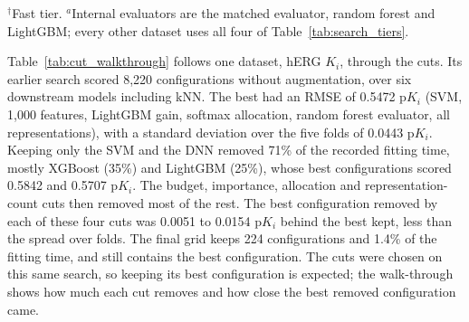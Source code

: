 \begin{table}[htbp]
\smallskip
{\footnotesize $^{\dagger}$Fast tier. $^{a}$Internal evaluators are the matched evaluator, random forest and LightGBM; every other dataset uses all four of Table~\ref{tab:search_tiers}.}
\caption[Search grid of each dataset.]{Search grid of each dataset. One row is one dataset. Budgets are consecutive values of Table~\ref{tab:search_tiers}. Importance: G, LightGBM gain; T, TreeSHAP; D, DeepLIFT. Allocation: L, linear; Q, squared; S, softmax; R, rank decay; all five adds the global pool. Configurations is the number scored in one search, over both downstream models.}
\label{tab:decided_grid}
\end{table}

Table~\ref{tab:cut_walkthrough} follows one dataset, hERG $K_i$, through the cuts. Its earlier search scored 8,220 configurations without augmentation, over six downstream models including kNN. The best had an RMSE of 0.5472 p$K_i$ (SVM, 1,000 features, LightGBM gain, softmax allocation, random forest evaluator, all representations), with a standard deviation over the five folds of 0.0443 p$K_i$. Keeping only the SVM and the DNN removed 71\% of the recorded fitting time, mostly XGBoost (35\%) and LightGBM (25\%), whose best configurations scored 0.5842 and 0.5707 p$K_i$. The budget, importance, allocation and representation-count cuts then removed most of the rest. The best configuration removed by each of these four cuts was 0.0051 to 0.0154 p$K_i$ behind the best kept, less than the spread over folds. The final grid keeps 224 configurations and 1.4\% of the fitting time, and still contains the best configuration. The cuts were chosen on this same search, so keeping its best configuration is expected; the walk-through shows how much each cut removes and how close the best removed configuration came.

